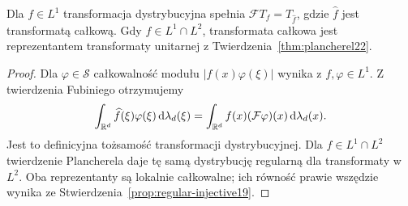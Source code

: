 \begin{stwierdzenie}
\label{prop:dt-fourier-l1-l2-compat}
Dla $f\in L^1$ transformacja dystrybucyjna spełnia
$\mathcal FT_f=T_{\widehat f}$, gdzie $\widehat f$
jest transformatą całkową. Gdy $f\in L^1\cap L^2$,
transformata całkowa jest reprezentantem transformaty
unitarnej z Twierdzenia~\ref{thm:plancherel22}.
\end{stwierdzenie}
\begin{proof}
Dla $\varphi\in\mathcal S$ całkowalność modułu
$|f(x)\varphi(\xi)|$ wynika z $f,\varphi\in L^1$.
Z twierdzenia Fubiniego otrzymujemy
\[
 \int_{\mathbb R^d}\widehat f(\xi)\varphi(\xi)\,\mathrm d\lambda_d(\xi)
 =\int_{\mathbb R^d}f(x)(\mathcal F\varphi)(x)\,\mathrm d\lambda_d(x).
\]
Jest to definicyjna tożsamość transformacji dystrybucyjnej.
Dla $f\in L^1\cap L^2$ twierdzenie Plancherela daje
tę samą dystrybucję regularną dla transformaty w $L^2$.
Oba reprezentanty są lokalnie całkowalne; ich równość
prawie wszędzie wynika ze
Stwierdzenia~\ref{prop:regular-injective19}.
\end{proof}
